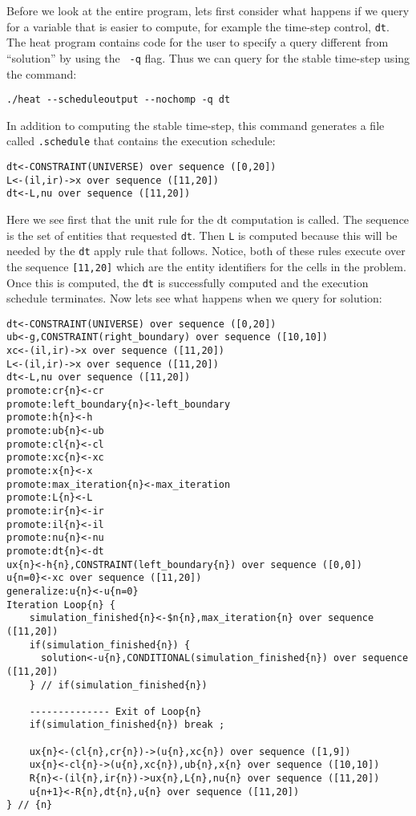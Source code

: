\documentclass[10pt,epsf,letterpaper,twoside]{book}
\begin{document}
Before we look at the entire program, lets first consider what happens
if we query for a variable that is easier to compute, for example the
time-step control, {\tt dt}.  The heat program contains code for the
user to specify a query different from ``solution'' by using the {\tt
  -q} flag.  Thus we can query for the stable time-step using the
command:
\begin{verbatim}
./heat --scheduleoutput --nochomp -q dt
\end{verbatim}

In addition to computing the stable time-step, this command generates a
file called {\tt .schedule} that contains the execution schedule:
\begin{verbatim}
dt<-CONSTRAINT(UNIVERSE) over sequence ([0,20])
L<-(il,ir)->x over sequence ([11,20])
dt<-L,nu over sequence ([11,20])
\end{verbatim}

Here we see first that the unit rule for the dt computation is
called.  The sequence is the set of entities that requested {\tt dt}.
Then {\tt L} is computed because this will be needed by the {\tt dt}
apply rule that follows.  Notice, both of these rules execute over the
sequence {\tt [11,20]} which are the entity identifiers for the
cells in the problem.  Once this is computed, the {\tt dt} is
successfully computed and the execution schedule terminates.  Now lets
see what happens when we query for solution:

\begin{verbatim}
dt<-CONSTRAINT(UNIVERSE) over sequence ([0,20])
ub<-g,CONSTRAINT(right_boundary) over sequence ([10,10])
xc<-(il,ir)->x over sequence ([11,20])
L<-(il,ir)->x over sequence ([11,20])
dt<-L,nu over sequence ([11,20])
promote:cr{n}<-cr
promote:left_boundary{n}<-left_boundary
promote:h{n}<-h
promote:ub{n}<-ub
promote:cl{n}<-cl
promote:xc{n}<-xc
promote:x{n}<-x
promote:max_iteration{n}<-max_iteration
promote:L{n}<-L
promote:ir{n}<-ir
promote:il{n}<-il
promote:nu{n}<-nu
promote:dt{n}<-dt
ux{n}<-h{n},CONSTRAINT(left_boundary{n}) over sequence ([0,0])
u{n=0}<-xc over sequence ([11,20])
generalize:u{n}<-u{n=0}
Iteration Loop{n} {
    simulation_finished{n}<-$n{n},max_iteration{n} over sequence ([11,20])
    if(simulation_finished{n}) {
      solution<-u{n},CONDITIONAL(simulation_finished{n}) over sequence ([11,20])
    } // if(simulation_finished{n})

    -------------- Exit of Loop{n}
    if(simulation_finished{n}) break ;

    ux{n}<-(cl{n},cr{n})->(u{n},xc{n}) over sequence ([1,9])
    ux{n}<-cl{n}->(u{n},xc{n}),ub{n},x{n} over sequence ([10,10])
    R{n}<-(il{n},ir{n})->ux{n},L{n},nu{n} over sequence ([11,20])
    u{n+1}<-R{n},dt{n},u{n} over sequence ([11,20])
} // {n}
\end{verbatim}
\end{document}
